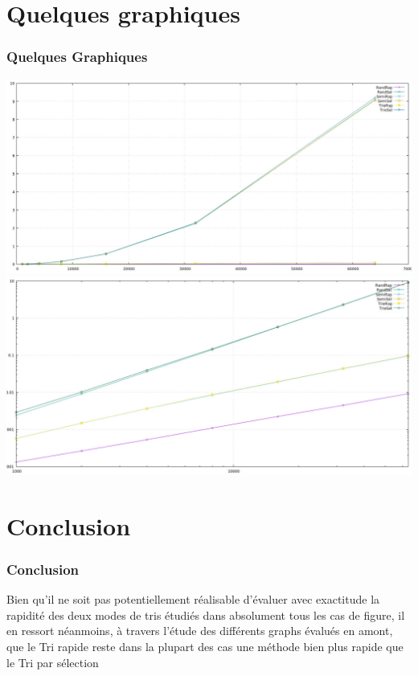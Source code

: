 \documentclass[12pt,french]{beamer}
\begin{document}
\section{Quelques graphiques}
\begin{frame}
\frametitle{Quelques Graphiques}
\begin{center}
\includegraphics[scale=0.15]{images/graph1.jpeg}
\vspace{0.1cm}
\includegraphics[scale=0.15]{images/graph2.jpeg}
\end{center}
\end{frame}
\section{Conclusion}
\begin{frame}
\frametitle{Conclusion}
Bien qu’il ne soit pas potentiellement réalisable d’évaluer avec exactitude la rapidité des deux modes de tris étudiés dans absolument tous les cas de figure, il en ressort néanmoins, à travers l’étude des différents graphs évalués en amont, que le Tri rapide reste dans la plupart des cas une méthode bien plus rapide que le Tri par sélection  \\
\end{frame}
\end{document}

